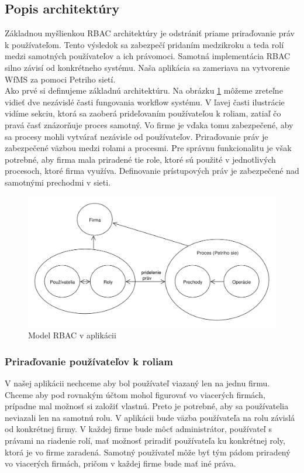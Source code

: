 \subsection{Popis architektúry} 
Základnou myšlienkou RBAC architektúry je odstrániť priame priraďovanie práv k používateľom. Tento výsledok sa zabezpečí pridaním medzikroku a teda rolí medzi samotných používateľov a ich právomoci. Samotná implementácia RBAC silno závisí od konkrétneho systému. Naša aplikácia sa zameriava na vytvorenie WfMS za pomoci Petriho sietí. \\Ako prvé si definujeme základnú architektúru. Na obrázku \ref{fig:model_rbac_v_aplikacii} môžeme zreteľne vidieť dve nezávislé časti fungovania workflow systému. V ľavej časti ilustrácie vidíme sekciu, ktorá sa zaoberá  prideľovaním  používateľou k roliam, zatiaľ čo pravá časť znázorňuje proces samotný. Vo firme je vďaka tomu zabezpečené, aby sa procesy mohli vytvárať nezávisle od používateľov. Priraďovanie práv je zabezpečené väzbou medzi rolami a procesmi. Pre správnu funkcionalitu je však potrebné, aby firma mala priradené tie role, ktoré sú použité v jednotlivých procesoch, ktoré firma využíva. Definovanie prístupových práv je zabezpečené nad samotnými prechodmi v sieti.

\begin{figure}[h]
	\centering
	\includegraphics[width=0.9\linewidth]{images/roles_in_petri_model}
	\caption{ Model RBAC v aplikácii}
	\label{fig:model_rbac_v_aplikacii}
\end{figure}

\subsubsection{Priraďovanie používateľov k roliam}
V našej aplikácii nechceme aby bol používateľ viazaný len na jednu firmu. Chceme aby pod rovnakým účtom mohol figurovať vo viacerých firmách, prípadne mal možnosť si založiť vlastnú. Preto je potrebné, aby sa používatelia neviazali len na samotnú rolu. V aplikácii bude väzba používateľa na rolu závislá od konkrétnej firmy. V každej firme bude môcť administrátor, používateľ s právami na riadenie rolí, mať možnosť priradiť používateľa ku konkrétnej roly, ktorá je vo firme zaradená. Samotný používateľ môže byť tým pádom priradený vo viacerých firmách, pričom v každej firme bude mať iné práva.\\

